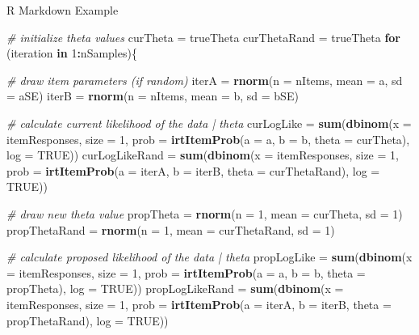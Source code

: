 \documentclass[ignorenonframetext,]{beamer}
\newenvironment{Shaded}{\begin{snugshade}}{\end{snugshade}}
\newcommand{\KeywordTok}[1]{\textcolor[rgb]{0.13,0.29,0.53}{\textbf{#1}}}
\newcommand{\DataTypeTok}[1]{\textcolor[rgb]{0.13,0.29,0.53}{#1}}
\newcommand{\DecValTok}[1]{\textcolor[rgb]{0.00,0.00,0.81}{#1}}
\newcommand{\StringTok}[1]{\textcolor[rgb]{0.31,0.60,0.02}{#1}}
\newcommand{\CommentTok}[1]{\textcolor[rgb]{0.56,0.35,0.01}{\textit{#1}}}
\newcommand{\OtherTok}[1]{\textcolor[rgb]{0.56,0.35,0.01}{#1}}
\newcommand{\ControlFlowTok}[1]{\textcolor[rgb]{0.13,0.29,0.53}{\textbf{#1}}}
\newcommand{\OperatorTok}[1]{\textcolor[rgb]{0.81,0.36,0.00}{\textbf{#1}}}
\newcommand{\NormalTok}[1]{#1}
\begin{document}
\begin{frame}[fragile]{R Markdown Example}
\begin{Shaded}
\begin{Highlighting}[]
\CommentTok{# initialize theta values}
\NormalTok{curTheta =}\StringTok{ }\NormalTok{trueTheta}
\NormalTok{curThetaRand =}\StringTok{ }\NormalTok{trueTheta}
\ControlFlowTok{for}\NormalTok{ (iteration }\ControlFlowTok{in} \DecValTok{1}\OperatorTok{:}\NormalTok{nSamples)\{}
  
  \CommentTok{# draw item parameters (if random)}
\NormalTok{  iterA =}\StringTok{ }\KeywordTok{rnorm}\NormalTok{(}\DataTypeTok{n =}\NormalTok{ nItems, }\DataTypeTok{mean =}\NormalTok{ a, }\DataTypeTok{sd =}\NormalTok{ aSE)}
\NormalTok{  iterB =}\StringTok{ }\KeywordTok{rnorm}\NormalTok{(}\DataTypeTok{n =}\NormalTok{ nItems, }\DataTypeTok{mean =}\NormalTok{ b, }\DataTypeTok{sd =}\NormalTok{ bSE)}
  
  \CommentTok{# calculate current likelihood of the data | theta}
\NormalTok{  curLogLike =}\StringTok{ }\KeywordTok{sum}\NormalTok{(}\KeywordTok{dbinom}\NormalTok{(}\DataTypeTok{x =}\NormalTok{ itemResponses, }\DataTypeTok{size =} \DecValTok{1}\NormalTok{, }\DataTypeTok{prob =} \KeywordTok{irtItemProb}\NormalTok{(}\DataTypeTok{a =}\NormalTok{ a, }\DataTypeTok{b =}\NormalTok{ b, }\DataTypeTok{theta =}\NormalTok{ curTheta), }\DataTypeTok{log =} \OtherTok{TRUE}\NormalTok{))}
\NormalTok{  curLogLikeRand =}\StringTok{ }\KeywordTok{sum}\NormalTok{(}\KeywordTok{dbinom}\NormalTok{(}\DataTypeTok{x =}\NormalTok{ itemResponses, }\DataTypeTok{size =} \DecValTok{1}\NormalTok{, }\DataTypeTok{prob =} \KeywordTok{irtItemProb}\NormalTok{(}\DataTypeTok{a =}\NormalTok{ iterA, }\DataTypeTok{b =}\NormalTok{ iterB, }\DataTypeTok{theta =}\NormalTok{ curThetaRand), }\DataTypeTok{log =} \OtherTok{TRUE}\NormalTok{))}
  
  \CommentTok{# draw new theta value}
\NormalTok{  propTheta =}\StringTok{ }\KeywordTok{rnorm}\NormalTok{(}\DataTypeTok{n =} \DecValTok{1}\NormalTok{, }\DataTypeTok{mean =}\NormalTok{ curTheta, }\DataTypeTok{sd =} \DecValTok{1}\NormalTok{)}
\NormalTok{  propThetaRand =}\StringTok{ }\KeywordTok{rnorm}\NormalTok{(}\DataTypeTok{n =} \DecValTok{1}\NormalTok{, }\DataTypeTok{mean =}\NormalTok{ curThetaRand, }\DataTypeTok{sd =} \DecValTok{1}\NormalTok{)}
  
  \CommentTok{# calculate proposed likelihood of the data | theta}
\NormalTok{  propLogLike =}\StringTok{ }\KeywordTok{sum}\NormalTok{(}\KeywordTok{dbinom}\NormalTok{(}\DataTypeTok{x =}\NormalTok{ itemResponses, }\DataTypeTok{size =} \DecValTok{1}\NormalTok{, }\DataTypeTok{prob =} \KeywordTok{irtItemProb}\NormalTok{(}\DataTypeTok{a =}\NormalTok{ a, }\DataTypeTok{b =}\NormalTok{ b, }\DataTypeTok{theta =}\NormalTok{ propTheta), }\DataTypeTok{log =} \OtherTok{TRUE}\NormalTok{))}
\NormalTok{  propLogLikeRand =}\StringTok{ }\KeywordTok{sum}\NormalTok{(}\KeywordTok{dbinom}\NormalTok{(}\DataTypeTok{x =}\NormalTok{ itemResponses, }\DataTypeTok{size =} \DecValTok{1}\NormalTok{, }\DataTypeTok{prob =} \KeywordTok{irtItemProb}\NormalTok{(}\DataTypeTok{a =}\NormalTok{ iterA, }\DataTypeTok{b =}\NormalTok{ iterB, }\DataTypeTok{theta =}\NormalTok{ propThetaRand), }\DataTypeTok{log =} \OtherTok{TRUE}\NormalTok{))}
  

\end{Highlighting}
\end{Shaded}
\end{frame}
\end{document}
